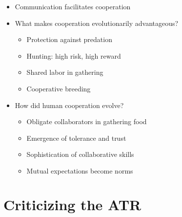 \documentclass[xcolor=table]{beamer}       %
\begin{document}
\begin{frame}{\insertsection}
    \begin{itemize}
        \item Communication facilitates cooperation
        \item What makes cooperation evolutionarily advantageous?
            \begin{itemize}
                \item Protection against predation
                \item Hunting: high risk, high reward
                \item Shared labor in gathering
                \item Cooperative breeding
            \end{itemize}
        \item How did human cooperation evolve?
            \begin{itemize}
                \item Obligate collaborators in gathering food
                \item Emergence of tolerance and trust
                \item Sophistication of collaborative skills
                \item Mutual expectations become norms
            \end{itemize}
    \end{itemize}
\end{frame}

\section{Criticizing the ATR}
\end{document}
